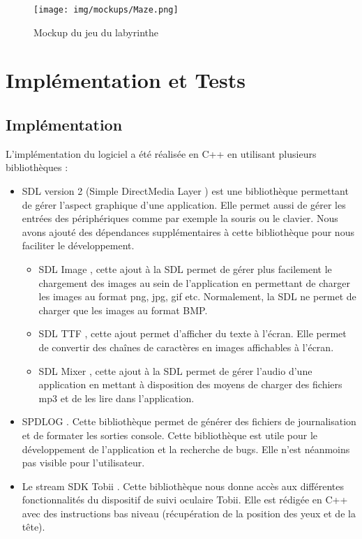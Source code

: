 \documentclass{polytech/polytech}
\begin{document}
\begin{figure}
    \centering
    \texttt{[image: img/mockups/Maze.png]}
    \caption{Mockup du jeu du labyrinthe}
    \label{fig:mockup_maze}
\end{figure}

\chapter{Implémentation et Tests}
\section{Implémentation}
L'implémentation du logiciel a été réalisée en C++ en utilisant plusieurs bibliothèques :
\begin{itemize}
\item SDL version 2 (Simple DirectMedia Layer \cite{sdl2}) est une bibliothèque permettant de gérer l'aspect graphique d'une application. Elle permet aussi de gérer les entrées des périphériques comme par exemple la souris ou le clavier. Nous avons ajouté des dépendances supplémentaires à cette bibliothèque pour nous faciliter le développement. 
\begin{itemize}
\item SDL Image \cite{sdl2_image}, cette ajout à la SDL permet de gérer plus facilement le chargement des images au sein de l'application en permettant de charger les images au format png, jpg, gif etc. Normalement, la SDL ne permet de charger que les images au format BMP.
\item SDL TTF \cite{sdl2_ttf}, cette ajout permet d'afficher du texte à l'écran. Elle permet de convertir des chaînes de caractères en images affichables à l'écran. 
\item SDL Mixer \cite{sdl2_mixer}, cette ajout à la SDL permet de gérer l'audio d'une application en mettant à disposition des moyens de charger des fichiers mp3 et de les lire dans l'application.
\end{itemize}
\item SPDLOG \cite{spdlog}. Cette bibliothèque permet de générer des fichiers de journalisation et de formater les sorties console. Cette bibliothèque est utile pour le développement de l'application et la recherche de bugs. Elle n'est néanmoins pas visible pour l'utilisateur. 
\item Le stream SDK Tobii \cite{tobiiApi}. Cette bibliothèque nous donne accès aux différentes fonctionnalités du dispositif de suivi oculaire Tobii. Elle est rédigée en C++ avec des instructions bas niveau (récupération de la position des yeux et de la tête).
\end{itemize}
\end{document}
